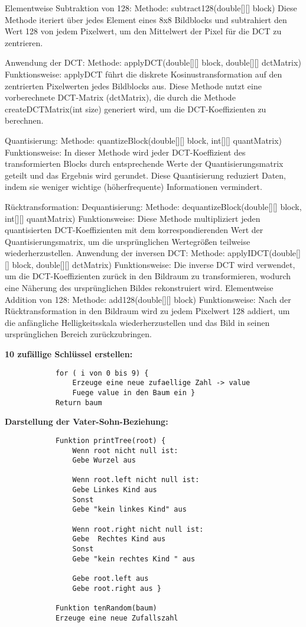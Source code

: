 \documentclass[12pt]{article}
\begin{document}
Elementweise Subtraktion von 128:
Methode: subtract128(double[][] block)
Diese Methode iteriert über jedes Element eines 8x8 Bildblocks und subtrahiert den Wert 128 von jedem Pixelwert, um den Mittelwert der Pixel für die DCT zu zentrieren.

Anwendung der DCT:
Methode: applyDCT(double[][] block, double[][] dctMatrix)
Funktionsweise: applyDCT führt die diskrete Kosinustransformation auf den zentrierten Pixelwerten jedes Bildblocks aus. Diese Methode nutzt eine vorberechnete DCT-Matrix (dctMatrix), die durch die Methode createDCTMatrix(int size) generiert wird, um die DCT-Koeffizienten zu berechnen.

Quantisierung:
Methode: quantizeBlock(double[][] block, int[][] quantMatrix)
Funktionsweise: In dieser Methode wird jeder DCT-Koeffizient des transformierten Blocks durch entsprechende Werte der Quantisierungsmatrix geteilt und das Ergebnis wird gerundet. Diese Quantisierung reduziert Daten, indem sie weniger wichtige (höherfrequente) Informationen vermindert.

Rücktransformation:
Dequantisierung:
Methode: dequantizeBlock(double[][] block, int[][] quantMatrix)
Funktionsweise: Diese Methode multipliziert jeden quantisierten DCT-Koeffizienten mit dem korrespondierenden Wert der Quantisierungsmatrix, um die ursprünglichen Wertegrößen teilweise wiederherzustellen.
Anwendung der inversen DCT:
Methode: applyIDCT(double[][] block, double[][] dctMatrix)
Funktionsweise: Die inverse DCT wird verwendet, um die DCT-Koeffizienten zurück in den Bildraum zu transformieren, wodurch eine Näherung des ursprünglichen Bildes rekonstruiert wird.
Elementweise Addition von 128:
Methode: add128(double[][] block)
Funktionsweise: Nach der Rücktransformation in den Bildraum wird zu jedem Pixelwert 128 addiert, um die anfängliche Helligkeitsskala wiederherzustellen und das Bild in seinen ursprünglichen Bereich zurückzubringen.


		\newline
		\textbf{10 zufällige Schlüssel erstellen:}
		\begin{lstlisting} 
			for ( i von 0 bis 9) {
				Erzeuge eine neue zufaellige Zahl -> value
				Fuege value in den Baum ein }
			Return baum
		\end{lstlisting} 
		\newpage %
		\textbf{Darstellung der Vater-Sohn-Beziehung:}
		\begin{lstlisting}
			Funktion printTree(root) {
				Wenn root nicht null ist:
				Gebe Wurzel aus
				
				Wenn root.left nicht null ist:
				Gebe Linkes Kind aus
				Sonst
				Gebe "kein linkes Kind" aus
				
				Wenn root.right nicht null ist:
				Gebe  Rechtes Kind aus
				Sonst
				Gebe "kein rechtes Kind " aus
				
				Gebe root.left aus
				Gebe root.right aus }
			
			Funktion tenRandom(baum)
			Erzeuge eine neue Zufallszahl
			
		\end{lstlisting}
		
\end{document}

